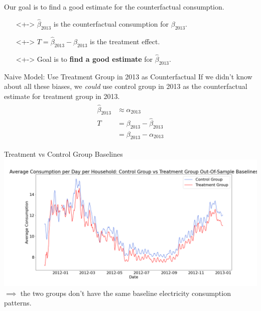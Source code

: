 \documentclass{beamer}
\begin{document}
\begin{frame}{Our goal is to find a good estimate for the counterfactual consumption.}
  \begin{itemize}
    \item[]<+-> $\hat\beta_{2013}$ is the counterfactual consumption for $\beta_{2013}$.
    \item[]<+-> $T = \hat\beta_{2013} - \beta_{2013}$ is the treatment effect.
    \item[]<+-> Goal is to \textbf{find a good estimate} for $\hat\beta_{2013}$.
  \end{itemize}
\end{frame}

\begin{frame}{Naive Model: Use Treatment Group in 2013 as Counterfactual}
  If we didn't know about all these biases, we \textit{could} use control group in 2013 as the counterfactual estimate for treatment group in 2013.
  \begin{align*}
    \begin{split}
      \hat\beta_{2013} & \approx \alpha_{2013} \\
      T & = \beta_{2013} - \hat\beta_{2013} \\
        & = \beta_{2013} - \alpha_{2013}
    \end{split}
  \end{align*}
\end{frame}

\begin{frame}{Treatment vs Control Group Baselines}
  \centering
  \includegraphics[width=1\textwidth]{images/avg-consumption-per-day-baseline.png}
  $\implies$ the two groups don't have the same baseline electricity consumption patterns.
\end{frame}
\end{document}
